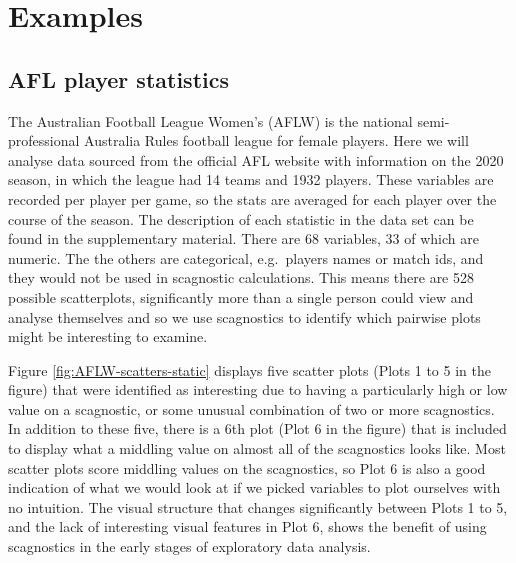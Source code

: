 \hypertarget{examples}{%
\section{Examples}\label{examples}}

\hypertarget{afl-player-statistics}{%
\subsection{AFL player statistics}\label{afl-player-statistics}}

The Australian Football League Women's (AFLW) is the national
semi-professional Australia Rules football league for female players.
Here we will analyse data sourced from the official AFL website with
information on the 2020 season, in which the league had 14 teams and
1932 players. These variables are recorded per player per game, so the
stats are averaged for each player over the course of the season. The
description of each statistic in the data set can be found in the
supplementary material. There are 68 variables, 33 of which are numeric.
The the others are categorical, e.g.~players names or match ids, and
they would not be used in scagnostic calculations. This means there are
528 possible scatterplots, significantly more than a single person could
view and analyse themselves and so we use scagnostics to identify which
pairwise plots might be interesting to examine.

Figure \ref{fig:AFLW-scatters-static} displays five scatter plots (Plots
1 to 5 in the figure) that were identified as interesting due to having
a particularly high or low value on a scagnostic, or some unusual
combination of two or more scagnostics. In addition to these five, there
is a 6th plot (Plot 6 in the figure) that is included to display what a
middling value on almost all of the scagnostics looks like. Most scatter
plots score middling values on the scagnostics, so Plot 6 is also a good
indication of what we would look at if we picked variables to plot
ourselves with no intuition. The visual structure that changes
significantly between Plots 1 to 5, and the lack of interesting visual
features in Plot 6, shows the benefit of using scagnostics in the early
stages of exploratory data analysis.

